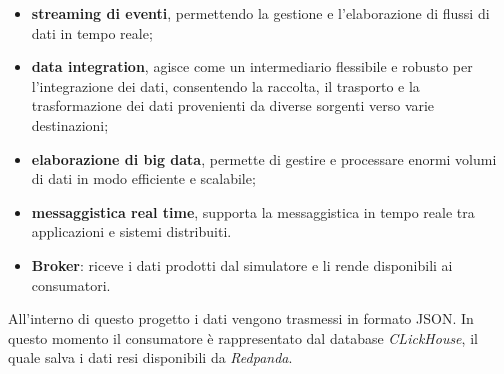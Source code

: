 \begin{itemize}
	\item \textbf{streaming di eventi}, permettendo la gestione e l'elaborazione di flussi di dati in tempo reale; 
	\item \textbf{data integration}, agisce come un intermediario flessibile e robusto per l'integrazione dei dati, consentendo la raccolta, il trasporto e la trasformazione dei dati provenienti da diverse sorgenti verso varie destinazioni;
	\item \textbf{elaborazione di big data}, permette di gestire e processare enormi volumi di dati in modo efficiente e scalabile;
	\item \textbf{messaggistica real time}, supporta la messaggistica in tempo reale tra applicazioni e sistemi distribuiti.
\end{itemize}
\begin{itemize}
	\item \textbf{Broker}: riceve i dati prodotti dal simulatore e li rende disponibili ai consumatori. 
\end{itemize}
All'interno di questo progetto i dati vengono trasmessi in formato JSON.
In questo momento il consumatore è rappresentato dal database \textit{CLickHouse}, il quale salva i dati resi disponibili da \textit{Redpanda}. 


